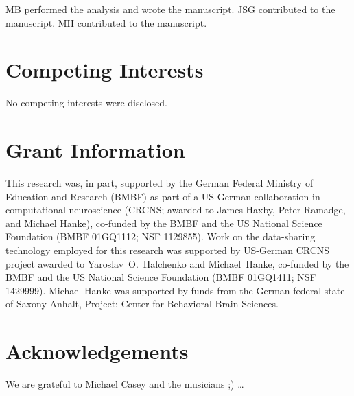 MB performed the analysis and wrote the manuscript.
JSG contributed to the manuscript.
MH contributed to the manuscript.


\section*{Competing Interests}
No competing interests were disclosed.

\section*{Grant Information}

This research was, in part, supported by the German Federal Ministry of
Education and Research (BMBF) as part of a US-German collaboration in
computational neuroscience (CRCNS; awarded to James Haxby, Peter Ramadge, and
Michael Hanke), co-funded by the BMBF and the US National Science Foundation
(BMBF 01GQ1112; NSF 1129855).  Work on the data-sharing technology employed for
this research was supported by US-German CRCNS project awarded to
Yaroslav~O.~Halchenko and Michael~Hanke, co-funded by the BMBF and the US
National Science Foundation (BMBF 01GQ1411; NSF 1429999).  Michael Hanke was
supported by funds from the German federal state of Saxony-Anhalt, Project:
Center for Behavioral Brain Sciences.


\section*{Acknowledgements}

We are grateful to Michael Casey and the musicians ;) \ldots






